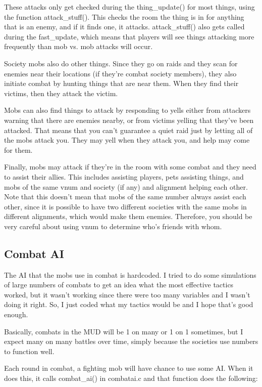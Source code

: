 These attacks only get checked during the thing\_update() for most
things, using the function attack\_stuff(). This checks the room the
thing is in for anything that is an enemy, and if it finds one, it
attacks. attack\_stuff() also gets called during the fast\_update,
which means that players will see things attacking more frequently
than mob vs. mob attacks will occur. 

Society mobs also do other things. Since they go on raids and they
scan for enemies near their locations (if they're combat society
members), they also initiate combat by hunting things that are near
them. When they find their victims, then they attack the victim. 

Mobs can also find things to attack by responding to yells either from
attackers warning that there are enemies nearby, or from victims
yelling that they've been attacked. That means that you can't
guarantee a quiet raid just by letting all of the mobs attack
you. They may yell when they attack you, and help may come for them.

Finally, mobs may attack if they're in the room with some combat and
they need to assist their allies. This includes assisting players,
pets assisting things, and mobs of the same vnum and society (if any)
and alignment helping each other. Note that this doesn't mean that
mobs of the same number always assist each other, since it is possible
to have two different societies with the same mobs in different
alignments, which would make them enemies. Therefore, you should be
very careful about using vnum to determine who's friends with whom.

\subsection{Combat AI}

The AI that the mobs use in combat is hardcoded. I tried to do some
simulations of large numbers of combats to get an idea what the most
effective tactics worked, but it wasn't working since there were too
many variables and I wasn't doing it right. So, I just coded what my
tactics would be and I hope that's good enough.

Basically, combats in the MUD will be 1 on many or 1 on 1 sometimes,
but I expect many on many battles over time, simply because the
societies use numbers to function well.

Each round in combat, a fighting mob will have chance to use some AI.
When it does this, it calls combat\_ai() in combatai.c and that
function does the following:

